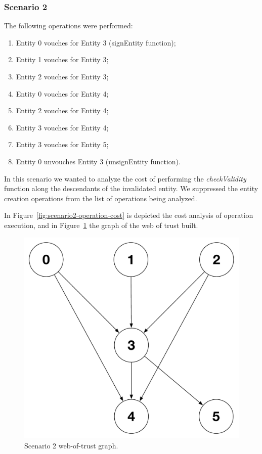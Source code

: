 \subsubsection{Scenario 2}

The following operations were performed:

\begin{enumerate}[label=\alph*.]
  \item Entity 0 vouches for Entity 3 (signEntity function); %
  \item Entity 1 vouches for Entity 3; %
  \item Entity 2 vouches for Entity 3; %
  \item Entity 0 vouches for Entity 4; %
  \item Entity 2 vouches for Entity 4; %
  \item Entity 3 vouches for Entity 4; %
  \item Entity 3 vouches for Entity 5; %
  \item Entity 0 unvouches Entity 3 (unsignEntity function). %
\end{enumerate}

In this scenario we wanted to analyze the cost of performing the \textit{checkValidity} function along the descendants of the invalidated entity.
We suppressed the entity creation operations from the list of operations being analyzed.

In Figure~\ref{fig:scenario2-operation-cost} is depicted the cost analysis of operation execution, and in Figure~\ref{fig:scenario2-wot-graph} the graph of the web of trust built.

\begin{figure}[htb]
  \centering
  \includegraphics[scale=0.5]{Figures/evaluation/wot-scenario2-graph.pdf}
  \caption{Scenario 2 web-of-trust graph.}
\label{fig:scenario2-wot-graph}
\end{figure}

